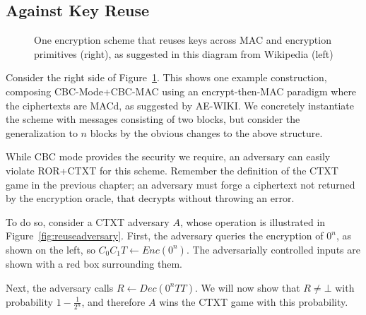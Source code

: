 \subsection{Against Key Reuse}

\begin{figure}[h]
\centering
{}
  \caption{One encryption scheme that reuses keys across MAC and encryption primitives (right), as suggested in this diagram from Wikipedia (left)}
\label{fig:reusescheme}
\end{figure}

Consider the right side of Figure~\ref{fig:reusescheme}.  This shows one example construction, composing CBC-Mode+CBC-MAC using an encrypt-then-MAC 
paradigm where the ciphertexts are MACd, as suggested by AE-WIKI.  We concretely instantiate the scheme with messages consisting of two blocks, but 
consider the generalization to $n$ blocks by the obvious changes to the above structure.

While CBC mode provides the security we require, an adversary can easily violate ROR+CTXT for this scheme.  Remember the definition of the CTXT game 
in the previous chapter; an adversary must forge a ciphertext not returned by the encryption oracle, that decrypts without throwing an error.

To do so, consider a CTXT adversary $A$, whose operation is illustrated in Figure~\ref{fig:reuseadversary}.  First, the adversary queries the 
encryption of $0^n$, as shown on the left, so $C_0C_1T \leftarrow Enc(0^n)$.  The adversarially controlled inputs are shown with a red box surrounding 
them.

Next, the adversary calls $R \leftarrow Dec(0^nTT)$.  We will now show that $R \neq \bot$ with probability $1-\frac{1}{2^n}$, and therefore $A$ wins 
the CTXT game with this probability.


